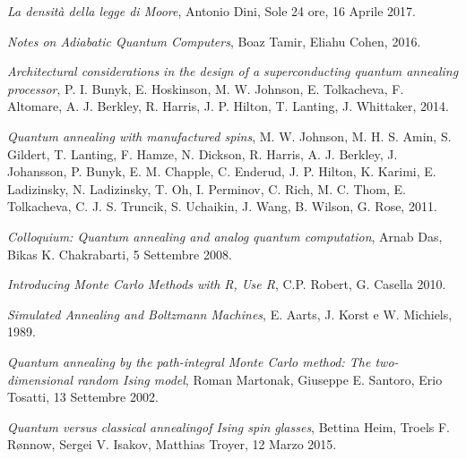 \newpage
\begin{thebibliography}{99}

    \textit{La densità della legge di Moore},
    Antonio Dini,
    Sole 24 ore,
    16 Aprile 2017.

    \textit{Notes on Adiabatic Quantum Computers},
    Boaz Tamir, Eliahu Cohen,
    2016.

    \textit{Architectural considerations in the design of a superconducting quantum annealing processor},
    P. I. Bunyk, E. Hoskinson, M. W. Johnson, E. Tolkacheva, F. Altomare, A. J. Berkley, R. Harris, J. P. Hilton, T. Lanting, J. Whittaker,
    2014.

    \textit{Quantum annealing with manufactured spins},
    M. W. Johnson, M. H. S. Amin, S. Gildert, T. Lanting, F. Hamze, N. Dickson, R. Harris, A. J. Berkley, J. Johansson, P. Bunyk, E. M. Chapple, C. Enderud, J. P. Hilton, K. Karimi, E. Ladizinsky, N. Ladizinsky, T. Oh, I. Perminov, C. Rich, M. C. Thom, E. Tolkacheva, C. J. S. Truncik, S. Uchaikin, J. Wang, B. Wilson, G. Rose,
    2011.




    \textit{Colloquium: Quantum annealing and analog quantum computation},
    Arnab Das, Bikas K. Chakrabarti,
    5 Settembre 2008.

    \textit{Introducing Monte Carlo Methods with R, Use R},
    C.P. Robert, G. Casella
    2010.

    \textit{Simulated Annealing and Boltzmann Machines},
    E. Aarts, J. Korst e W. Michiels,
    1989.

    \textit{Quantum annealing by the path-integral Monte Carlo method: The two-dimensional random Ising model},
    Roman Martonak, Giuseppe E. Santoro, Erio Tosatti,
    13 Settembre 2002.

    \textit{Quantum versus classical annealingof Ising spin glasses},
    Bettina Heim, Troels F. Rønnow, Sergei V. Isakov, Matthias Troyer,
    12 Marzo 2015.


\end{thebibliography}
